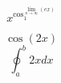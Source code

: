 \documentclass[12pt,a4paper]{article}
\begin{document}
$$
x^{\cos_{1}^{\lim_{n \to \infty} (ex)}}
$$

$$ \cos(2x) $$
$$ \oint_a^b {2x} dx $$
\end{document}
